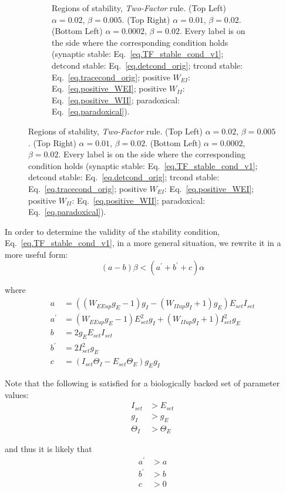 \documentclass[twocolumn]{article}
\newcommand{\EE}{\mathit{EE}}
\newcommand{\EI}{\mathit{EI}}
\newcommand{\II}{\mathit{II}}
\newcommand{\set}{\mathit{set}}
\newcommand{\up}{\mathit{up}}
\begin{document}
\begin{figure}[!ht]
{\begin{figure}[H]
\caption{Regions of stability, {\em Two-Factor} rule. (Top Left) $\alpha=0.02$, $\beta=0.005$. (Top Right) $\alpha=0.01$, $\beta=0.02$. (Bottom Left) $\alpha=0.0002$, $\beta=0.02$. Every label is on the side where the  corresponding  condition  holds (synaptic stable: Eq.\ \ref{eq.TF_stable_cond_v1}; detcond stable: Eq.\ \ref{eq.detcond_orig}; trcond stable: Eq.\ \ref{eq.tracecond_orig}; positive $W_{\EI}$: Eq.\ \ref{eq.positive_WEI}; positive $W_{\II}$: Eq.\ \ref{eq.positive_WII}; paradoxical: Eq.\ \ref{eq.paradoxical}).}
\label{fig.TF_stability}
\end{figure}}
\end{figure}


In order to determine the validity of the stability condition, Eq.\ \ref{eq.TF_stable_cond_v1}, in a more general situation, we rewrite it in a more useful form:
\begin{equation}
(a - b)\beta < (a^\prime + b^\prime + c) \alpha
\label{eq.TF_stable_cond_v2}
\end{equation}

\noindent where
\begin{displaymath}
\begin{aligned}
a & = ((W_{\EE\up}g_E - 1) g_I - (W_{\II\up}g_I + 1) g_E) E_{\set} I_{\set} \\
a^\prime & = (W_{\EE\up}g_E - 1)E_{\set}^2 g_I + (W_{\II\up}g_I + 1)I_{\set}^2 g_E \\
b & = 2g_E E_{\set} I_{\set} \\
b^\prime & = 2I_{\set}^2 g_E \\
c & = (I_{\set}\Theta_I - E_{\set}\Theta_E)g_E g_I
\end{aligned}
\end{displaymath}

\noindent Note that the following is satisfied for a biologically backed set of parameter values:
\begin{displaymath}
\begin{aligned}
I_{\set} & > E_{\set} \\
g_I & > g_E \\
\Theta_I & > \Theta_E
\end{aligned}
\end{displaymath}

\noindent and thus it is likely that
\begin{displaymath}
\begin{aligned}
a^\prime & > a \\
b^\prime & > b \\
c & > 0
\end{aligned}
\end{displaymath}
\end{document}

